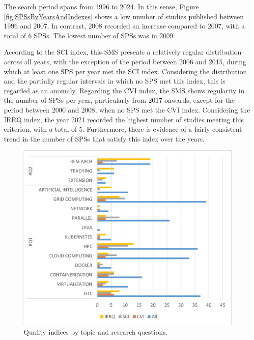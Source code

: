 The search period spans from 1996 to 2024. In this sense, Figure \ref{fig:SPSsByYearsAndIndexes} shows a low number of studies published between 1996 and 2007. In contrast, 2008 recorded an increase compared to 2007, with a total of 6 SPSs. The lowest number of SPSs was in 2009.

According to the SCI index, this SMS presents a relatively regular distribution across all years, with the exception of the period between 2006 and 2015, during which at least one SPS per year met the SCI index. Considering the distribution and the partially regular intervals in which no SPS met this index, this is regarded as an anomaly. Regarding the CVI index, the SMS shows regularity in the number of SPSs per year, particularly from 2017 onwards, except for the period between 2000 and 2008, when no SPS met the CVI index. Considering the IRRQ index, the year 2021 recorded the highest number of studies meeting this criterion, with a total of 5. Furthermore, there is evidence of a fairly consistent trend in the number of SPSs that satisfy this index over the years.

\begin{figure}[htbp]
	\centering
	\vspace{10pt}
	\includegraphics[scale=0.7]{resources/figures/IndexesByTopicAndRQs.jpg}
	\vspace{6pt}
	\caption{Quality indices by topic and research questions.}
	\label{fig:IndexesByTopicAndRQs}
\end{figure}

